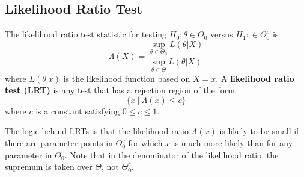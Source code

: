 \subsection{Likelihood Ratio Test}

\begin{definition}
    The likelihood ratio test statistic for testing $H_0 : \theta \in \Theta_0$ versus 
    $H_1 : \in \Theta^c_0$ is 
    \begin{equation}
        \Lambda(X) = \frac{\displaystyle \sup_{\theta \in \Theta_0} L(\theta | X)}{\displaystyle \sup_{\theta \in \Theta} L(\theta | X)}
    \end{equation}
    where $L(\theta|x)$ is the likelihood function based on $X = x$. A \textbf{likelihood 
    ratio test (LRT)} is any test that has a rejection region of the form 
    \[
        \{ x \> | \> \Lambda(x) \leq c \}
    \]
    where $c$ is a constant satisfying $0 \leq c \leq 1$.
\end{definition}

The logic behind LRTs is that the likelihood ratio $\Lambda(x)$ is likely to be small if there are 
parameter points in $\Theta^c_0$ for which $x$ is much more likely than for any 
parameter in $\Theta_0$. Note that in the denominator of the likelihood ratio, 
the supremum is taken over $\Theta$, not $\Theta^c_0$.

